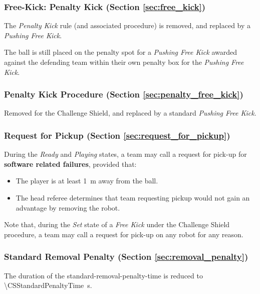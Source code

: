 \subsubsection{Free-Kick: Penalty Kick (Section \ref{sec:free_kick})}

The \emph{Penalty Kick} rule (and associated procedure) is removed, and replaced by a \emph{Pushing Free Kick}.

The ball is still placed on the penalty spot for a \emph{Pushing Free Kick} awarded against the defending team within their own penalty box for the \emph{Pushing Free Kick}.

\subsubsection{Penalty Kick Procedure (Section \ref{sec:penalty_free_kick})}

Removed for the Challenge Shield, and replaced by a standard \emph{Pushing Free Kick}.

\subsubsection{Request for Pickup (Section \ref{sec:request_for_pickup})}

During the \emph{Ready} and \emph{Playing} states, a team may call a request for pick-up for \textbf{software related failures}, provided that:
\begin{itemize}
    \item The player is at least \qty{1}{\meter} away from the ball.
    \item The head referee determines that team requesting pickup would not gain an advantage by removing the robot.
\end{itemize}

Note that, during the \emph{Set} state of a \emph{Free Kick} under the Challenge Shield procedure, a team may call a request for pick-up on any robot for any reason.

\subsubsection{Standard Removal Penalty (Section \ref{sec:removal_penalty})}

The duration of the standard-removal-penalty-time is reduced to \qty{\CSStandardPenaltyTime}{\second}.


